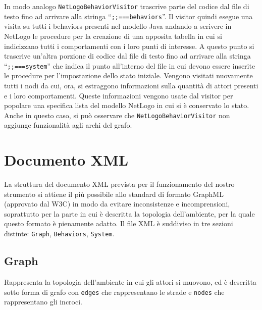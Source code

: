 In modo analogo \texttt{NetLogoBehaviorVisitor} trascrive parte del codice dal file di testo fino ad arrivare alla stringa “\texttt{;;===behaviors}”. Il visitor quindi esegue una visita su tutti i behaviors presenti nel modello Java andando a scrivere in NetLogo le procedure per la creazione di una apposita tabella in cui si indicizzano tutti i comportamenti con i loro punti di interesse. A questo punto si trascrive un'altra porzione di codice dal file di testo fino ad arrivare alla stringa “\texttt{;;===system}” che indica il punto all'interno del file in cui devono essere inserite le procedure per l'impostazione dello stato iniziale. Vengono visitati nuovamente tutti i nodi da cui, ora, si estraggono informazioni sulla quantità di attori presenti e i loro comportamenti. Queste informazioni vengono usate dal visitor per popolare una specifica lista del modello NetLogo in cui si è conservato lo stato. Anche in questo caso, si può osservare che \texttt{NetLogoBehaviorVisitor} non aggiunge funzionalità agli archi del grafo. 

\section{Documento XML}
\label{sec:doc-xml}



La struttura del documento XML prevista per il funzionamento del nostro strumento si attiene il più possibile allo standard di formato GraphML \cite{graphml} (approvato dal W3C) in modo da evitare inconsistenze e incomprensioni, soprattutto per la parte in cui è descritta la topologia dell'ambiente, per la quale questo formato è pienamente adatto. Il file XML è suddiviso in tre sezioni distinte: \texttt{Graph}, \texttt{Behaviors}, \texttt{System}.

\subsection{Graph} 

Rappresenta la topologia dell'ambiente in cui gli attori si muovono, ed è descritta sotto forma di grafo con \texttt{edges} che rappresentano le strade e \texttt{nodes} che rappresentano gli incroci.

